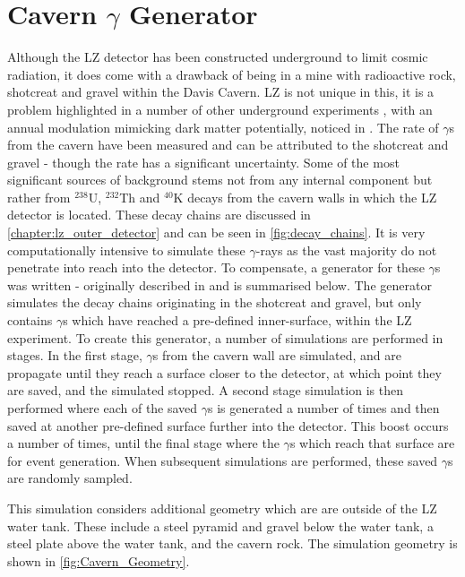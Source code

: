 \section{Cavern $\gamma$ Generator}
\label{sec:cavern_gamma_generator}

\par
Although the LZ detector has been constructed underground to limit cosmic radiation, it does come with a drawback of being in a mine with radioactive rock, shotcreat and gravel within the Davis Cavern.
LZ is not unique in this, it is a problem highlighted in a number of other underground experiments \cite{cavern_gamma_annual_modulation_CoGeNT_ref, cavern_gammas_in_Soudan_mine_ref}, with an annual modulation mimicking dark matter potentially, noticed in \cite{cavern_gamma_annual_modulation_CoGeNT_ref}.
The rate of $\gamma$s from the cavern have been measured and can be attributed to the shotcreat and gravel \cite{LZ_Gamma_Ray_Background_ref} - though the rate has a significant uncertainty.
Some of the most significant sources of background stems not from any internal component but rather from $^{238}$U, $^{232}$Th and $^{40}$K decays from the cavern walls in which the LZ detector is located.
These decay chains are discussed in \autoref{chapter:lz_outer_detector} and can be seen in \autoref{fig:decay_chains}.
It is very computationally intensive to simulate these $\gamma$-rays as the vast majority do not penetrate into reach into the detector.
To compensate, a generator for these $\gamma$s was written - originally described in \cite{rg_generator_ref} and is summarised below.
The generator simulates the decay chains originating in the shotcreat and gravel, but only contains $\gamma$s which have reached a pre-defined inner-surface, within the LZ experiment.
To create this generator, a number of simulations are performed in stages.
In the first stage, $\gamma$s from the cavern wall are simulated, and are propagate until they reach a surface closer to the detector, at which point they are saved, and the simulated stopped.
A second stage simulation is then performed where each of the saved $\gamma$s is generated a number of times and then saved at another pre-defined surface further into the detector.
This boost occurs a number of times, until the final stage where the $\gamma$s which reach that surface are for event generation.
When subsequent simulations are performed, these saved $\gamma$s are randomly sampled. 

\par
This simulation considers additional geometry which are are outside of the LZ water tank.
These include a steel pyramid and gravel below the water tank, a steel plate above the water tank, and the cavern rock.
The simulation geometry is shown in \autoref{fig:Cavern_Geometry}.

